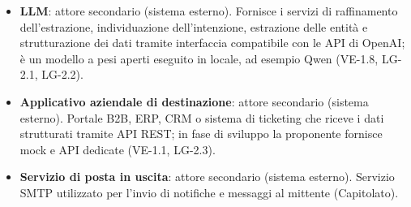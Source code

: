 \begin{itemize}
    \item \textbf{LLM}: attore secondario (sistema esterno). Fornisce i servizi di raffinamento dell'estrazione, individuazione dell'intenzione, estrazione delle entità e strutturazione dei dati tramite interfaccia compatibile con le API di OpenAI; è un modello a pesi aperti eseguito in locale, ad esempio Qwen (VE-1.8, LG-2.1, LG-2.2).
    \item \textbf{Applicativo aziendale di destinazione}: attore secondario (sistema esterno). Portale B2B, ERP, CRM o sistema di ticketing che riceve i dati strutturati tramite API REST; in fase di sviluppo la proponente fornisce mock e API dedicate (VE-1.1, LG-2.3).
    \item \textbf{Servizio di posta in uscita}: attore secondario (sistema esterno). Servizio SMTP utilizzato per l'invio di notifiche e messaggi al mittente (Capitolato).
\end{itemize}